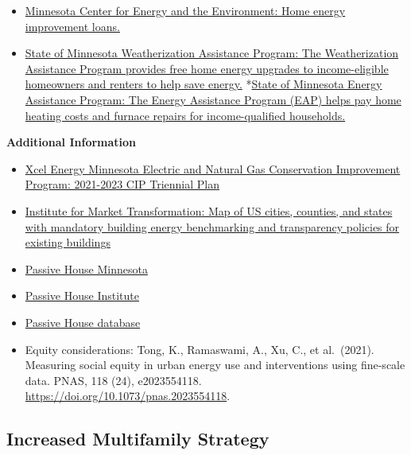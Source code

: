 \documentclass[
]{book}
\providecommand{\tightlist}{%
  \setlength{\itemsep}{0pt}\setlength{\parskip}{0pt}}
\begin{document}
\begin{itemize}
\tightlist
\item
  \href{https://www.mncee.org/residential-statewide-lending}{Minnesota Center for Energy and the Environment: Home energy improvement loans.}
\item
  \href{https://mn.gov/commerce/consumers/consumer-assistance/weatherization/}{State of Minnesota Weatherization Assistance Program: The Weatherization Assistance Program provides free home energy upgrades to income-eligible homeowners and renters to help save energy.}
  *\href{https://mn.gov/commerce/consumers/consumer-assistance/energy-assistance/}{State of Minnesota Energy Assistance Program: The Energy Assistance Program (EAP) helps pay home heating costs and furnace repairs for income-qualified households.}
\end{itemize}

\textbf{Additional Information}

\begin{itemize}
\item
  \href{https://www.edockets.state.mn.us/EFiling/edockets/searchDocuments.do?method=showPoup\&documentId=\%7B40BC0B73-0000-C918-8CE1-D182E3E20EED\%7D\&documentTitle=20207-164492-01}{Xcel Energy Minnesota Electric and Natural Gas Conservation Improvement Program: 2021-2023 CIP Triennial Plan}
\item
  \href{https://www.imt.org/resources/map-u-s-building-benchmarking-policies/}{Institute for Market Transformation: Map of US cities, counties, and states with mandatory building energy benchmarking and transparency policies for existing buildings}
\item
  \href{https://passivehouseminnesota.org/passive-house/}{Passive House Minnesota}
\item
  \href{https://passivehouse.com/}{Passive House Institute}
\item
  \href{https://passivehouse-database.org/index.php?lang=en\#k_minnesota}{Passive House database}
\item
  Equity considerations: Tong, K., Ramaswami, A., Xu, C., et al.~(2021). Measuring social equity in urban energy use and interventions using fine-scale data. PNAS, 118 (24), e2023554118. \url{https://doi.org/10.1073/pnas.2023554118}.
\end{itemize}

\hypertarget{increased-multifamily-strategy}{%
\subsection{Increased Multifamily Strategy}\label{increased-multifamily-strategy}}
\end{document}
